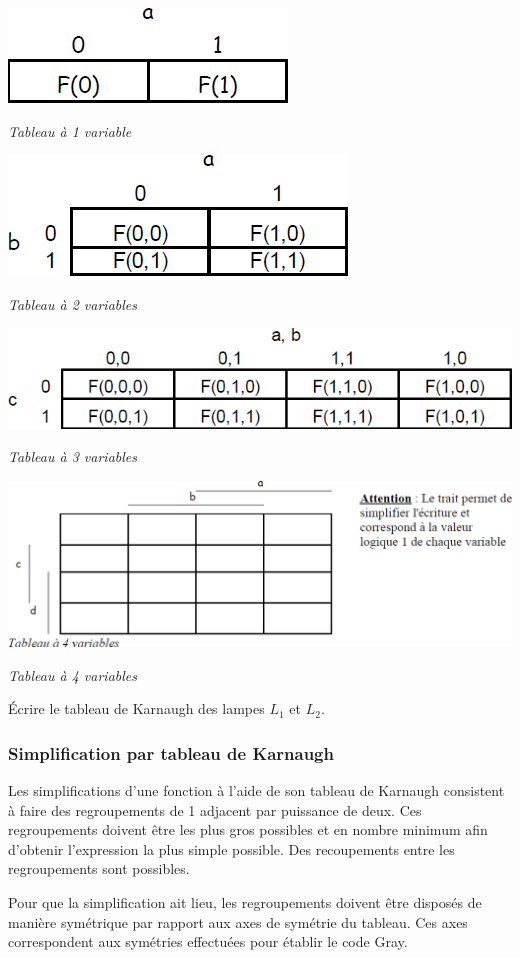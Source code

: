 \documentclass[11pt,oneside]{article}
\begin{document}
\begin{center}
\includegraphics[width=.3\textwidth]{png/fig_10}

\textit{Tableau à 1 variable}

\includegraphics[width=.35\textwidth]{png/fig_11}

\textit{Tableau à 2 variables}

\includegraphics[width=.6\textwidth]{png/fig_12}

\textit{Tableau à 3 variables}

\includegraphics[width=.6\textwidth]{png/fig_13}

\textit{Tableau à 4 variables}
\end{center}

\begin{exemple}
Écrire le tableau de Karnaugh des lampes $L_1$ et $L_2$. 
\end{exemple}


\subsubsection{Simplification par tableau de Karnaugh}
Les simplifications d'une fonction à l'aide de son tableau de Karnaugh consistent à faire des regroupements de 1 adjacent par puissance de deux. Ces regroupements doivent être les plus gros possibles et en nombre minimum afin d'obtenir l'expression la plus simple possible. Des recoupements entre les regroupements sont possibles. 

Pour que la simplification ait lieu, les regroupements doivent être disposés de manière symétrique par rapport aux axes de symétrie du tableau. Ces axes correspondent aux symétries effectuées pour établir le code Gray. 
\end{document}
